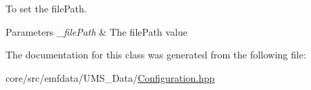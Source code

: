 To set the filePath. 


\begin{DoxyParams}{Parameters}
{\em \_\-filePath} & The filePath value \\
\hline
\end{DoxyParams}


The documentation for this class was generated from the following file:\begin{DoxyCompactItemize}
\item 
core/src/emfdata/UMS\_\-Data/\hyperlink{Configuration_8hpp}{Configuration.hpp}\end{DoxyCompactItemize}

